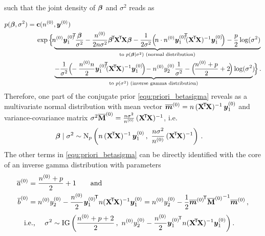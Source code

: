such that the joint density of $\boldsymbol{\beta}$ and $\sigma^2$ reads as

\begin{align}
p(\bbeta,\sigma^2) &= \mbf{c}(\nz, \byz) \nonumber\\ & \hspace*{3ex} 
                      \exp\Big\{\underbrace{\!\! \nz {\byz_1}^{\!\tra}\! \frac{\bbeta}{\sigma^2}
                                            -\frac{\nz}{2n\sigma^2} \bbeta^\tra\! \XtX \bbeta
                                            -\frac{1}{2\sigma^2} \Big(\! n\cdot \nz {\byz_1}^{\!\tra }\!\! (\XtX)^{-1} \byz_1\! \Big)
                                            -\frac{p}{2} \log(\sigma^2)}_{\text{to }p(\bbeta\mid\sigma^2) \text{ (normal distribution)}}
                                                  \nonumber\\ & \hspace*{9ex}
                                \underbrace{-\frac{1}{\sigma^2} \Big(\!\!-\frac{\nz n}{2} {\byz_1}^{\!\tra}\!\! (\XtX)^{-1} \byz_1\! \Big)\!
                                            -\nz  \yz_2 \frac{1}{\sigma^2}
                                            -\Big(\!\frac{\nz + p}{2} + 2\!\Big) \log(\sigma^2)\!\!}_{\text{to } p(\sigma^2) \text{ (inverse gamma distribution)}} \Big\} \,.
\label{equ:priori_betasigma}
\end{align}
Therefore, one part of the conjugate prior \eqref{equ:priori_betasigma} reveals as a
multivariate normal distribution with mean vector
$\overline{{\bm m}}^{(0)} = n\,(\mathbf{X}^{{\mbox{\!\scriptsize\textsf{T}}}} \! \mathbf{X})^{-1}\, {\bm y}^{(0)}_1$ and
variance-covariance matrix $\sigma^2\overline{\mathbf{M}}^{(0)} = \frac{n\sigma^2}{n^{(0)}}\, (\mathbf{X}^{{\mbox{\!\scriptsize\textsf{T}}}} \! \mathbf{X})^{-1}$, i.e.\
\begin{align}\label{equ:priori_betaggsigma}
\boldsymbol{\beta}\mid\sigma^2 &\sim \operatorname{N}_p \left( n\,(\mathbf{X}^{{\mbox{\!\scriptsize\textsf{T}}}} \! \mathbf{X})^{-1}\, {\bm y}^{(0)}_1\,,\ \frac{n\sigma^2}{n^{(0)}}\, (\mathbf{X}^{{\mbox{\!\scriptsize\textsf{T}}}} \! \mathbf{X})^{-1} \right)\,.
\end{align}
The other terms in \eqref{equ:priori_betasigma} can be directly identified with the core of
an inverse gamma distribution with parameters
\begin{align*}
\taz &= \frac{\nz + p}{2} + 1 \qquad \text{and}\\ %
\tbz &= \nz \yz_2 -\frac{\nz}{2} {\byz_1}^\tra n(\XtX)^{-1} \byz_1
      = \nz \yz_2 -\frac{1}{2} {\tmz}^\tra {\tMz}^{-1} \tmz\,,%
\end{align*}
\begin{align}\label{equ:priori_sigma}
\text{i.e., }\quad
\sigma^2 &\sim \operatorname{IG} \bigg( \frac{n^{(0)} + p + 2}{2}\,,\ n^{(0)} y^{(0)}_2 - \frac{n^{(0)}}{2} {{\bm y}^{(0)}_1}^{{\mbox{\!\scriptsize\textsf{T}}}} n(\mathbf{X}^{{\mbox{\!\scriptsize\textsf{T}}}} \! \mathbf{X})^{-1} {\bm y}^{(0)}_1  \bigg)\,.
\end{align}

